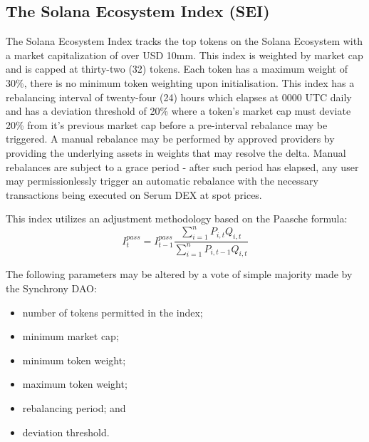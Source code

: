 \documentclass[10pt]{article}
\begin{document}
					\subsection{The Solana Ecosystem Index (SEI)}
					The Solana Ecosystem Index tracks the top tokens on the Solana Ecosystem with
					a market capitalization of over USD 10mm. This index is weighted by market cap
					and is capped at thirty-two (32) tokens. Each token has a maximum weight of
					30\%, there is no minimum token weighting upon initialisation. This index has
					a rebalancing interval of twenty-four (24) hours which elapses at 0000 UTC daily
					and has a deviation threshold of 20\% where a token's market cap must deviate
					20\% from it's previous market cap before a pre-interval rebalance may be
					triggered. A manual rebalance may be performed by approved providers by providing the underlying assets in
					weights that may resolve the delta. Manual rebalances are subject to a grace
					period - after such period has elapsed, any user
					may permissionlessly trigger an automatic rebalance with the necessary
					transactions being executed on Serum DEX at spot
					prices.

					This index utilizes an adjustment methodology based on the Paasche formula:
					\[I^{pass}_t = I^{pass}_{t-1}\frac{\sum_{i=1}^n P_{i,t}Q_{i,t}}{\sum_{i=1}^n
					P_{i,t-1}Q_{i,t}}\]

					The following parameters may be altered by a vote of simple majority made by the
					Synchrony DAO:
					\begin{itemize}
						\item number of tokens permitted in the index;
						\item minimum market cap;
						\item minimum token weight;
						\item maximum token weight;
						\item rebalancing period; and
						\item deviation threshold.
					\end{itemize}
\end{document}

